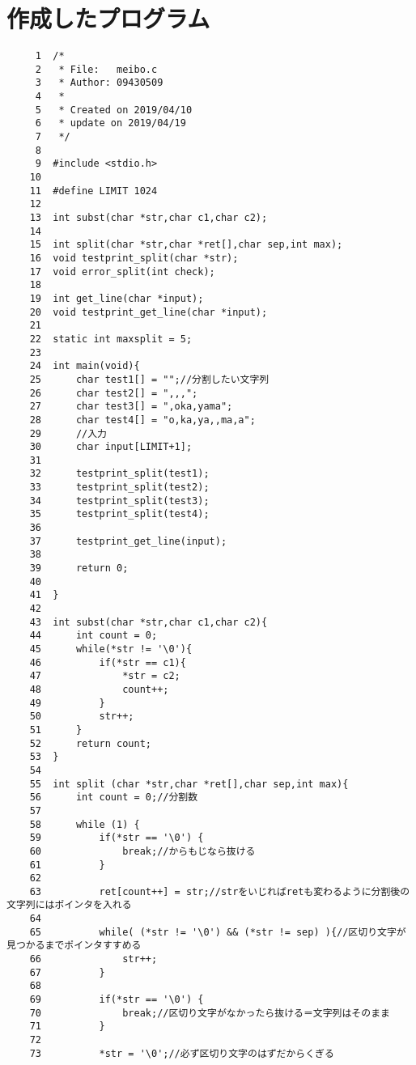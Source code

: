 \documentclass[a4j,11pt]{jarticle}
\begin{document}
\section{作成したプログラム} \label{sec:sourcecode}
{\fontsize{10pt}{11pt} \selectfont
\begin{verbatim}
     1	/* 
     2	 * File:   meibo.c
     3	 * Author: 09430509
     4	 *
     5	 * Created on 2019/04/10
     6	 * update on 2019/04/19
     7	 */
     8	
     9	#include <stdio.h>
    10	
    11	#define LIMIT 1024
    12	
    13	int subst(char *str,char c1,char c2);
    14	
    15	int split(char *str,char *ret[],char sep,int max);
    16	void testprint_split(char *str);
    17	void error_split(int check);
    18	
    19	int get_line(char *input);
    20	void testprint_get_line(char *input);
    21	
    22	static int maxsplit = 5;
    23	
    24	int main(void){
    25	    char test1[] = "";//分割したい文字列
    26	    char test2[] = ",,,";
    27	    char test3[] = ",oka,yama";
    28	    char test4[] = "o,ka,ya,,ma,a";
    29	    //入力
    30	    char input[LIMIT+1];
    31	    
    32	    testprint_split(test1);
    33	    testprint_split(test2);
    34	    testprint_split(test3);
    35	    testprint_split(test4);
    36	
    37	    testprint_get_line(input);
    38	    
    39	    return 0;
    40	
    41	}
    42	
    43	int subst(char *str,char c1,char c2){
    44	    int count = 0;
    45	    while(*str != '\0'){
    46	        if(*str == c1){
    47	            *str = c2;
    48	            count++;
    49	        }
    50	        str++;
    51	    }
    52	    return count;
    53	}
    54	
    55	int split (char *str,char *ret[],char sep,int max){
    56	    int count = 0;//分割数
    57	
    58	    while (1) {
    59	        if(*str == '\0') {
    60	            break;//からもじなら抜ける
    61	        }
    62	       
    63	        ret[count++] = str;//strをいじればretも変わるように分割後の文字列にはポインタを入れる
    64	
    65	        while( (*str != '\0') && (*str != sep) ){//区切り文字が見つかるまでポインタすすめる 
    66	            str++;
    67	        }
    68	        
    69	        if(*str == '\0') {
    70	            break;//区切り文字がなかったら抜ける＝文字列はそのまま
    71	        }                                                                                                   
    72	
    73	        *str = '\0';//必ず区切り文字のはずだからくぎる

\end{verbatim}}
\end{document}
